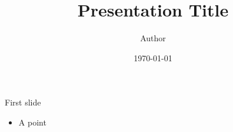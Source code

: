 \documentclass{beamer}
\title{Presentation Title}
\author{Author}
\date{\today}
\begin{document}
\frame{\titlepage}

\begin{frame}{First slide}
  \begin{itemize}
    \item A point
  \end{itemize}
\end{frame}
\end{document}
